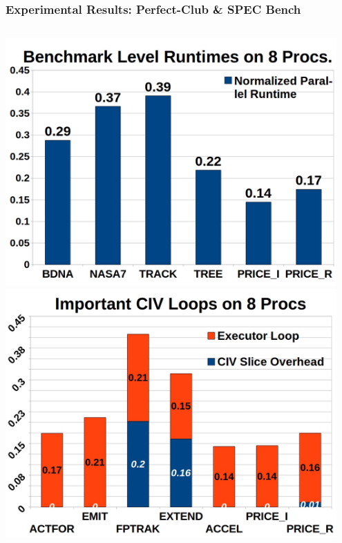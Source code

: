 \documentclass{beamer}
\begin{document}
\begin{frame}[fragile,t]
  \frametitle{Experimental Results: Perfect-Club \& SPEC Bench} \vspace{-1ex}
\begin{columns} 
\includegraphics[width=0.95\textwidth]{Figures/EmpRes/BenchParRes.jpg}
\includegraphics[width=0.95\textwidth]{Figures/EmpRes/LoopParRes.jpg} 
\end{columns}
\bigskip


\end{frame}
\end{document}
